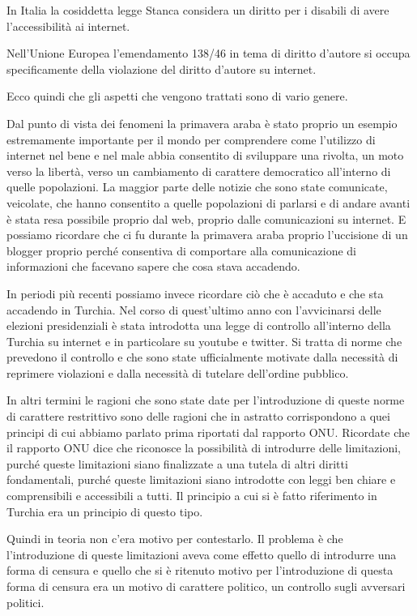  In Italia la cosiddetta legge Stanca considera un diritto per i disabili di avere l'accessibilità ai internet.\par
 Nell'Unione Europea l'emendamento 138/46 in tema di diritto d'autore si occupa specificamente della violazione del diritto d'autore su internet.\par
 Ecco quindi che gli aspetti che vengono trattati sono di vario genere.\par
 Dal punto di vista dei fenomeni la primavera araba è stato proprio un esempio estremamente importante per il mondo per comprendere come l'utilizzo di internet nel bene e nel male abbia consentito di sviluppare una rivolta, un moto verso la libertà, verso un cambiamento di carattere democratico all'interno di quelle popolazioni. La maggior parte delle notizie che sono state comunicate, veicolate, che hanno consentito a quelle popolazioni di parlarsi e di andare avanti è stata resa possibile proprio dal web, proprio dalle comunicazioni su internet. E possiamo ricordare che ci fu durante la primavera araba proprio l'uccisione di un blogger proprio perché consentiva di comportare alla comunicazione di informazioni che facevano sapere che cosa stava accadendo. \par
 In periodi più recenti possiamo invece ricordare ciò che è accaduto e che sta accadendo in Turchia. Nel corso di quest'ultimo anno con l'avvicinarsi delle elezioni presidenziali è stata introdotta una legge di controllo all'interno della Turchia su internet e in particolare su youtube e twitter. Si tratta di norme che prevedono il controllo e che sono state ufficialmente motivate dalla necessità di reprimere violazioni e dalla necessità di tutelare dell'ordine pubblico.\par
 In altri termini le ragioni che sono state date per l'introduzione di queste norme di carattere restrittivo sono delle ragioni che in astratto corrispondono a quei principi di cui abbiamo parlato prima riportati dal rapporto ONU. Ricordate che il rapporto ONU dice che riconosce la possibilità di introdurre delle limitazioni, purché queste limitazioni siano finalizzate a una tutela di altri diritti fondamentali, purché queste limitazioni siano introdotte con leggi ben chiare e comprensibili e accessibili a tutti. Il principio a cui si è fatto riferimento in Turchia era un principio di questo tipo.\par
 Quindi in teoria non c'era motivo per contestarlo. Il problema è che l'introduzione di queste limitazioni aveva come effetto quello di introdurre una forma di censura e quello che si è ritenuto motivo per l'introduzione di questa forma di censura era un motivo di carattere politico, un controllo sugli avversari politici.\par
